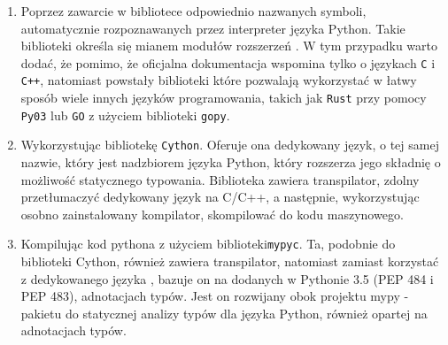 \documentclass[10pt, a4paper]{article}
\newcommand{\code}[1]{\texttt{#1}}
\begin{document}
\begin{sloppypar}
\begin{enumerate}
      \item Poprzez zawarcie w bibliotece odpowiednio nazwanych symboli, automatycznie
        rozpoznawanych przez interpreter języka Python. Takie biblioteki określa się mianem
        modułów rozszerzeń \cite{Extending_Python_With_C_Cpp}. W tym przypadku warto
        dodać, że pomimo, że oficjalna dokumentacja wspomina tylko o językach \code{C} i
        \code{C++}, natomiast powstały biblioteki które pozwalają wykorzystać w łatwy sposób
        wiele innych języków programowania, takich jak \code{Rust} przy pomocy \code{Py03}\cite{PyO3}
        lub \code{GO} z użyciem biblioteki \code{gopy}\cite{gopy}.

      \item Wykorzystując bibliotekę \code{Cython}\cite{Cython_Org}\cite{Cython_The_Best_Of_Both}.
        Oferuje ona dedykowany język, o tej samej nazwie, który jest nadzbiorem języka Python,
        który rozszerza jego składnię o możliwość statycznego typowania. Biblioteka zawiera
        transpilator, zdolny przetłumaczyć dedykowany język na C/C++, a następnie,
        wykorzystując osobno zainstalowany kompilator, skompilować do kodu maszynowego.

      \item Kompilując kod pythona z użyciem biblioteki\code{mypyc}\cite{mypyc}. Ta,
        podobnie do biblioteki Cython, również zawiera transpilator, natomiast zamiast
        korzystać z dedykowanego języka , bazuje on na dodanych w Pythonie 3.5\cite{Python_3_5}
        (PEP 484\cite{PEP_484} i PEP 483\cite{PEP_483}), adnotacjach typów. Jest on rozwijany
        obok projektu mypy - pakietu do statycznej analizy typów dla języka Python,
        również opartej na adnotacjach typów\cite{mypy}.
    \end{enumerate}


\end{sloppypar}
\end{document}
